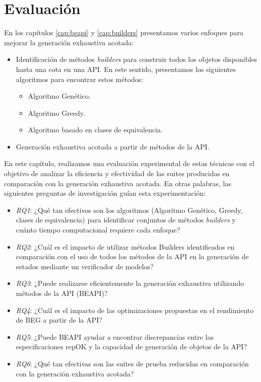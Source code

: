 \chapter[Evaluaci\'on]{Evaluaci\'on}
\label{cap:evaluation}

En los capítulos \ref{cap:beapi} y \ref{cap:builders} presentamos varios enfoques para mejorar la generación exhaustiva acotada:

\begin{itemize}
\item Identificación de métodos \emph{builders} para construir todos los objetos disponibles hasta una cota en una API. En este sentido, presentamos los siguientes algoritmos para encontrar estos métodos:
\begin{itemize}
\item Algoritmo Genético.
\item Algoritmo Greedy.
\item Algoritmo basado en clases de equivalencia.
\end{itemize}
\item Generación exhaustiva acotada a partir de métodos de la API.
\end{itemize}

En este capítulo, realizamos una evaluación experimental de estas técnicas con el objetivo de analizar la eficiencia y efectividad de las suites producidas en comparación con la generación exhaustiva acotada. En otras palabras, las siguientes preguntas de investigación guían esta experimentación:

\begin{itemize}
\item \emph{RQ1}: ¿Qué tan efectivos son los algoritmos (Algoritmo Genético, Greedy, clases de equivalencia) para identificar conjuntos de métodos \emph{builders} y cuánto tiempo computacional requiere cada enfoque?
\item \emph{RQ2}: ¿Cuál es el impacto de utilizar métodos Builders identificados en comparación con el uso de todos los métodos de la API en la generación de estados mediante un verificador de modelos?
\item \emph{RQ3}: ¿Puede realizarse eficientemente la generación exhaustiva utilizando métodos de la API (BEAPI)?
\item\emph{RQ4}: ¿Cuál es el impacto de las optimizaciones propuestas en el rendimiento de BEG a partir de la API?
\item\emph{RQ5}: ¿Puede BEAPI ayudar a encontrar discrepancias entre las especificaciones repOK y la capacidad de generación de objetos de la API?
\item\emph{RQ6}: ¿Qué tan efectivas son las suites de prueba reducidas en comparación con la generación exhaustiva acotada?
\end{itemize}

